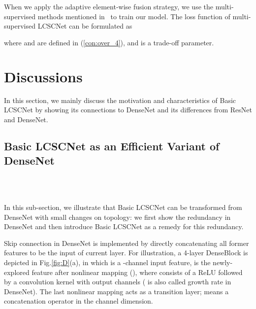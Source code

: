 \documentclass[journal]{IEEEtran}
\begin{document}
When we apply the adaptive element-wise fusion strategy, we use the multi-supervised methods mentioned in~\cite{kim2016deeply,Tai-MemNet-2017} to train our model. The loss function of multi-supervised LCSCNet can be formulated as 

where  and  are defined in (\ref{con:over_4}), and  is a trade-off parameter. 


\section{Discussions}\label{s:s_4}

In this section, we mainly discuss the motivation and characteristics of Basic LCSCNet by showing its connections to DenseNet and its differences from ResNet and DenseNet. 

\subsection{Basic LCSCNet as an Efficient Variant of DenseNet}
\begin{figure*}
    \centering
    \label{fig:D_1}\\
    \label{fig:D_2}\hfill
    \label{fig:D_3}\\
    \label{fig:D_4}\hfill
    \label{fig:D_5}\hfill
    \caption{\small Sketch on how a DenseBlock can be simplified into a Basic LCSCNet. For a better understanding, the channel number of each feature is marked beside the feature, and the kernel size of each convolution kernel is marked beside the kernel in form of ``input\_chanenel   kernel\_width  kernel\_height  output\_channel''.}
    \label{fig:D} 
\end{figure*}

In this sub-section, we illustrate that Basic LCSCNet can be transformed from DenseNet with small changes on topology: we first show the redundancy in DenseNet and then introduce Basic LCSCNet as a remedy for this redundancy.

Skip connection in DenseNet is implemented by directly concatenating all former features to be the input of current layer. For illustration, a 4-layer DenseBlock is depicted in Fig.\ref{fig:D}(a), in which  is a -channel input feature,  is the newly-explored feature after nonlinear mapping  (), where  consists of a ReLU followed by a  convolution kernel with  output channels ( is also called growth rate in DenseNet). The last nonlinear mapping  acts as a transition layer;  means a concatenation operator in the channel dimension.
\end{document}
